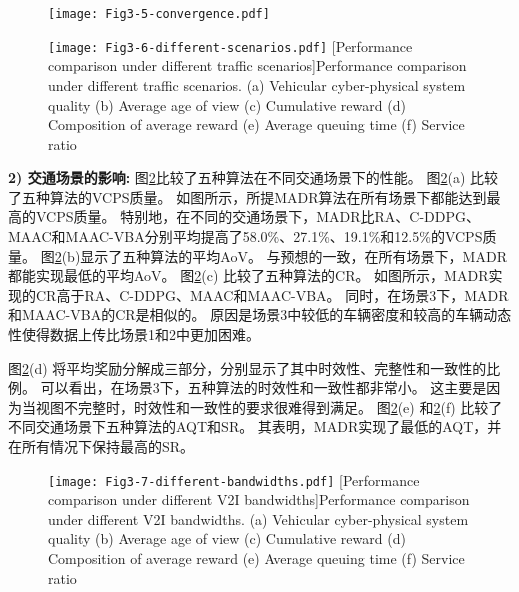 \begin{figure}[h]
\centering
  \texttt{[image: Fig3-5-convergence.pdf]}
  \label{fig 3-5}
\end{figure} 

\begin{figure}[h]
  \centering
  \texttt{[image: Fig3-6-different-scenarios.pdf]}
  [Performance comparison under different traffic scenarios]{Performance comparison under different traffic scenarios. (a) Vehicular cyber-physical system quality (b) Average age of view (c) Cumulative reward (d) Composition of average reward (e) Average queuing time (f) Service ratio}
  \label{fig 3-6}
\end{figure}

\textbf{2) 交通场景的影响:}
图\ref{fig 3-6}比较了五种算法在不同交通场景下的性能。
图\ref{fig 3-6}(a) 比较了五种算法的VCPS质量。
如图所示，所提MADR算法在所有场景下都能达到最高的VCPS质量。
特别地，在不同的交通场景下，MADR比RA、C-DDPG、MAAC和MAAC-VBA分别平均提高了58.0\%、27.1\%、19.1\%和12.5\%的VCPS质量。
图\ref{fig 3-6}(b)显示了五种算法的平均AoV。
与预想的一致，在所有场景下，MADR都能实现最低的平均AoV。
图\ref{fig 3-6}(c) 比较了五种算法的CR。
如图所示，MADR实现的CR高于RA、C-DDPG、MAAC和MAAC-VBA。
同时，在场景3下，MADR和MAAC-VBA的CR是相似的。
原因是场景3中较低的车辆密度和较高的车辆动态性使得数据上传比场景1和2中更加困难。

图\ref{fig 3-6}(d) 将平均奖励分解成三部分，分别显示了其中时效性、完整性和一致性的比例。
可以看出，在场景3下，五种算法的时效性和一致性都非常小。
这主要是因为当视图不完整时，时效性和一致性的要求很难得到满足。
图\ref{fig 3-6}(e) 和\ref{fig 3-6}(f) 比较了不同交通场景下五种算法的AQT和SR。
其表明，MADR实现了最低的AQT，并在所有情况下保持最高的SR。

\begin{figure}[h]
  \centering
  \texttt{[image: Fig3-7-different-bandwidths.pdf]}
  [Performance comparison under different V2I bandwidths]{Performance comparison under different V2I bandwidths. (a) Vehicular cyber-physical system quality (b) Average age of view (c) Cumulative reward (d) Composition of average reward (e) Average queuing time (f) Service ratio}
  \label{fig 3-7}
\end{figure}

